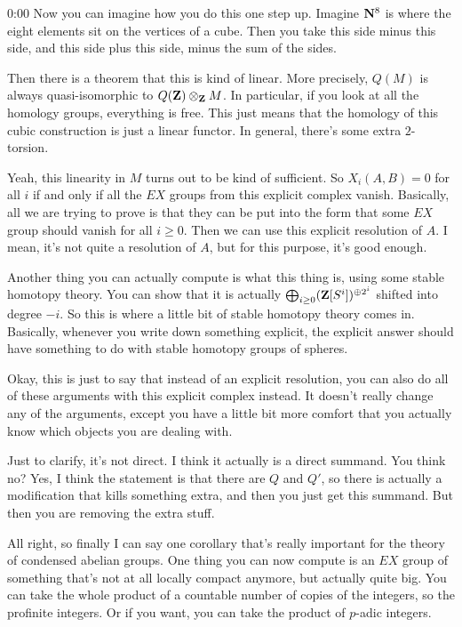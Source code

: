 \begin{unfinished}{0:00}
Now you can imagine how you do this one step up. Imagine $\mathbf N^8$ is where the eight elements sit on the vertices of a cube. Then you take this side minus this side, and this side plus this side, minus the sum of the sides.

Then there is a theorem that this is kind of linear. More precisely, $Q(M)$ is always quasi-isomorphic to $Q(\mathbf Z) \otimes_\mathbf Z M$. In particular, if you look at all the homology groups, everything is free. This just means that the homology of this cubic construction is just a linear functor. In general, there's some extra $2$-torsion.

Yeah, this linearity in $M$ turns out to be kind of sufficient. So $X_i(A,B)=0$ for all $i$ if and only if all the $EX$ groups from this explicit complex vanish. Basically, all we are trying to prove is that they can be put into the form that some $EX$ group should vanish for all $i \geq 0$. Then we can use this explicit resolution of $A$. I mean, it's not quite a resolution of $A$, but for this purpose, it's good enough.

Another thing you can actually compute is what this thing is, using some stable homotopy theory. You can show that it is actually $\bigoplus_{i \geq 0} (\mathbf Z[S^i])^{\oplus 2^i}$ shifted into degree $-i$. So this is where a little bit of stable homotopy theory comes in. Basically, whenever you write down something explicit, the explicit answer should have something to do with stable homotopy groups of spheres.

Okay, this is just to say that instead of an explicit resolution, you can also do all of these arguments with this explicit complex instead. It doesn't really change any of the arguments, except you have a little bit more comfort that you actually know which objects you are dealing with.

Just to clarify, it's not direct. I think it actually is a direct summand. You think no? Yes, I think the statement is that there are $Q$ and $Q'$, so there is actually a modification that kills something extra, and then you just get this summand. But then you are removing the extra stuff.

All right, so finally I can say one corollary that's really important for the theory of condensed abelian groups. One thing you can now compute is an $EX$ group of something that's not at all locally compact anymore, but actually quite big. You can take the whole product of a countable number of copies of the integers, so the profinite integers. Or if you want, you can take the product of $p$-adic integers.


\end{unfinished}
